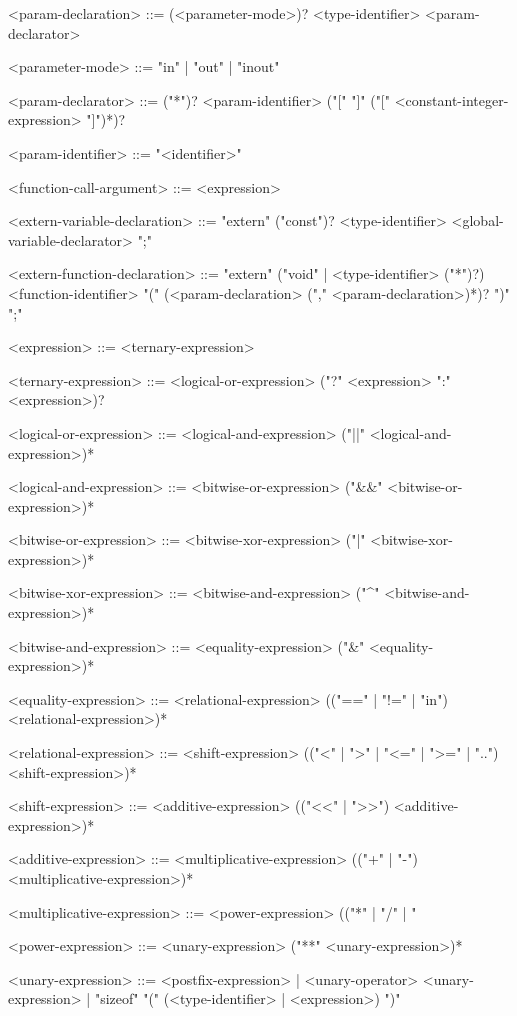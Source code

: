 \documentclass[11pt,letterpaper,twoside,openany]{book}
\begin{document}
\begin{grammar}
<param-declaration> ::=
   (<parameter-mode>)? <type-identifier> <param-declarator>

<parameter-mode> ::= "in" | "out" | "inout"

<param-declarator> ::=
   ("*")? <param-identifier> ("[" "]" ("[" <constant-integer-expression> "]")*)?

<param-identifier> ::= "<identifier>"

<function-call-argument> ::= <expression>

<extern-variable-declaration> ::=
   "extern" ("const")? <type-identifier> <global-variable-declarator> ";"

<extern-function-declaration> ::=
   "extern" ("void" | <type-identifier> ("*")?) <function-identifier>
   "(" (<param-declaration> ("," <param-declaration>)*)? ")" ";"

<expression> ::= <ternary-expression>

<ternary-expression> ::=
   <logical-or-expression> ("?" <expression> ":" <expression>)?

<logical-or-expression> ::=
   <logical-and-expression> ("||" <logical-and-expression>)*

<logical-and-expression> ::=
   <bitwise-or-expression> ("&&" <bitwise-or-expression>)*

<bitwise-or-expression> ::=
   <bitwise-xor-expression> ("|" <bitwise-xor-expression>)*

<bitwise-xor-expression> ::=
   <bitwise-and-expression> ("^" <bitwise-and-expression>)*

<bitwise-and-expression> ::=
   <equality-expression> ("&" <equality-expression>)*

<equality-expression> ::=
   <relational-expression> (("==" | "!=" | "in") <relational-expression>)*

<relational-expression> ::=
   <shift-expression> (("<" | ">" | "<=" | ">=" | "..") <shift-expression>)*

<shift-expression> ::=
   <additive-expression> (("<<" | ">>") <additive-expression>)*

<additive-expression> ::=
   <multiplicative-expression> (("+" | "-") <multiplicative-expression>)*

<multiplicative-expression> ::=
   <power-expression> (("*" | "/" | "%

<power-expression> ::=
   <unary-expression> ("**" <unary-expression>)*

<unary-expression> ::=
   <postfix-expression> |
   <unary-operator> <unary-expression> |
   "sizeof" "(" (<type-identifier> | <expression>) ")"


\end{grammar}
\end{document}
